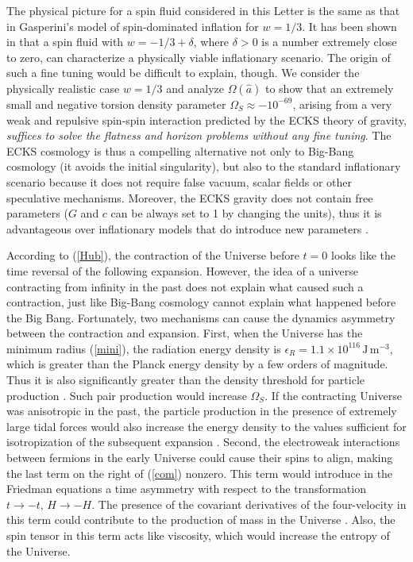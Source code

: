 \documentclass[prd,onecolumn,nofootinbib,showkeys]{revtex4}
\begin{document}
The physical picture for a spin fluid considered in this Letter is the same as that in Gasperini's model of spin-dominated inflation \cite{Gas} for $w=1/3$.
It has been shown in \cite{Gas} that a spin fluid with $w=-1/3+\delta$, where $\delta>0$ is a number extremely close to zero, can characterize a physically viable inflationary scenario.
The origin of such a fine tuning would be difficult to explain, though.
We consider the physically realistic case $w=1/3$ and analyze $\Omega(\hat{a})$ to show that an extremely small and negative torsion density parameter $\Omega_S\approx -10^{-69}$, arising from a very weak and repulsive spin-spin interaction predicted by the ECKS theory of gravity, {\em suffices to solve the flatness and horizon problems without any fine tuning}.
The ECKS cosmology is thus a compelling alternative not only to Big-Bang cosmology (it avoids the initial singularity), but also to the standard inflationary scenario because it does not require false vacuum, scalar fields or other speculative mechanisms.
Moreover, the ECKS gravity does not contain free parameters ($G$ and $c$ can be always set to 1 by changing the units), thus it is advantageous over inflationary models that do introduce new parameters \cite{inf2}.

According to (\ref{Hub}), the contraction of the Universe before $t=0$ looks like the time reversal of the following expansion.
However, the idea of a universe contracting from infinity in the past does not explain what caused such a contraction, just like Big-Bang cosmology cannot explain what happened before the Big Bang.
Fortunately, two mechanisms can cause the dynamics asymmetry between the contraction and expansion.
First, when the Universe has the minimum radius (\ref{mini}), the radiation energy density is $\epsilon_R=1.1\times10^{116}\,\mbox{J}\,\mbox{m}^{-3}$, which is greater than the Planck energy density by a few orders of magnitude.
Thus it is also significantly greater than the density threshold for particle production \cite{HHKN,part1,part2,part3}.
Such pair production would increase $\Omega_S$.
If the contracting Universe was anisotropic in the past, the particle production in the presence of extremely large tidal forces would also increase the energy density to the values sufficient for isotropization of the subsequent expansion \cite{part1,part2}.
Second, the electroweak interactions between fermions in the early Universe could cause their spins to align, making the last term on the right of (\ref{com}) nonzero.
This term would introduce in the Friedman equations a time asymmetry with respect to the transformation $t\rightarrow-t,\,H\rightarrow-H$.
The presence of the covariant derivatives of the four-velocity in this term could contribute to the production of mass in the Universe \cite{Lord}.
Also, the spin tensor in this term acts like viscosity, which would increase the entropy of the Universe.
\end{document}

